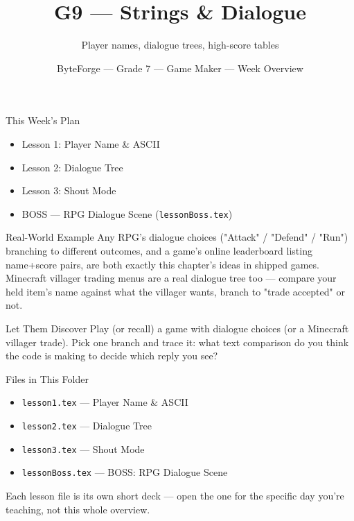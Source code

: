 \documentclass[aspectratio=169]{beamer}
\title{G9 — Strings \& Dialogue}
\subtitle{Player names, dialogue trees, high-score tables}
\author{ByteForge --- Grade 7 --- Game Maker --- Week Overview}
\date{}
\begin{document}
\begin{frame}
    \titlepage
\end{frame}

\begin{frame}{This Week's Plan}
    \begin{itemize}
        \item Lesson 1: Player Name \& ASCII
        \item Lesson 2: Dialogue Tree
        \item Lesson 3: Shout Mode
        \item[$\bigstar$] BOSS --- RPG Dialogue Scene (\texttt{lessonBoss.tex})
    \end{itemize}
\end{frame}

\begin{frame}{Real-World Example}
    \Large
    Any RPG's dialogue choices ("Attack" / "Defend" / "Run") branching to different outcomes, and a game's online leaderboard listing name+score pairs, are both exactly this chapter's ideas in shipped games. Minecraft villager trading menus are a real dialogue tree too — compare your held item's name against what the villager wants, branch to "trade accepted" or not.
\end{frame}


\begin{frame}{Let Them Discover}
    \Large
    Play (or recall) a game with dialogue choices (or a Minecraft villager trade). Pick one branch and trace it: what text comparison do you think the code is making to decide which reply you see?
\end{frame}

\begin{frame}{Files in This Folder}
    \small
    \begin{itemize}
        \item \texttt{lesson1.tex} --- Player Name \& ASCII
        \item \texttt{lesson2.tex} --- Dialogue Tree
        \item \texttt{lesson3.tex} --- Shout Mode
        \item \texttt{lessonBoss.tex} --- BOSS: RPG Dialogue Scene
    \end{itemize}
    \vspace{0.5em}
    \normalsize Each lesson file is its own short deck --- open the one for
    the specific day you're teaching, not this whole overview.
\end{frame}
\end{document}
